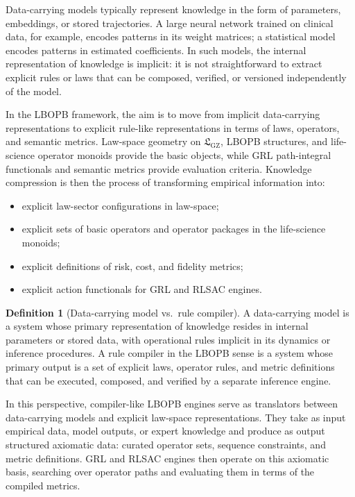 \documentclass[11pt]{book}
\theoremstyle{plain}
\theoremstyle{definition}
\newtheorem{definition}[theorem]{Definition}
\theoremstyle{remark}
\newcommand{\GZLS}{\ensuremath{\mathfrak{L}_{\mathrm{GZ}}}}       \newcommand{\GZLT}{\ensuremath{M_{!w}}}                           \newcommand{\GZLOC}{\ensuremath{A_M}}                             \newcommand{\GZLCurv}{\ensuremath{\mathcal{F}_{\mathrm{law}}}}
\begin{document}
Data-carrying models typically represent knowledge in the form of
parameters, embeddings, or stored trajectories. A large neural network
trained on clinical data, for example, encodes patterns in its weight
matrices; a statistical model encodes patterns in estimated
coefficients. In such models, the internal representation of knowledge
is implicit: it is not straightforward to extract explicit rules or
laws that can be composed, verified, or versioned independently of the
model.

In the LBOPB framework, the aim is to move from implicit
data-carrying representations to explicit rule-like representations in
terms of laws, operators, and semantic metrics. Law-space geometry on
$\GZLS$, LBOPB structures, and life-science operator monoids provide
the basic objects, while GRL path-integral functionals and semantic
metrics provide evaluation criteria. Knowledge compression is then the
process of transforming empirical information into:

\begin{itemize}
  \item explicit law-sector configurations in law-space;
  \item explicit sets of basic operators and operator packages in
        the life-science monoids;
  \item explicit definitions of risk, cost, and fidelity metrics;
  \item explicit action functionals for GRL and RLSAC engines.
\end{itemize}

\begin{definition}[Data-carrying model vs.\ rule compiler]
A data-carrying model is a system whose primary representation of
knowledge resides in internal parameters or stored data, with
operational rules implicit in its dynamics or inference procedures.
A rule compiler in the LBOPB sense is a system whose primary output
is a set of explicit laws, operator rules, and metric definitions
that can be executed, composed, and verified by a separate inference
engine.
\end{definition}

In this perspective, compiler-like LBOPB engines serve as translators
between data-carrying models and explicit law-space representations.
They take as input empirical data, model outputs, or expert knowledge
and produce as output structured axiomatic data: curated operator
sets, sequence constraints, and metric definitions. GRL and RLSAC
engines then operate on this axiomatic basis, searching over operator
paths and evaluating them in terms of the compiled metrics.
\end{document}
